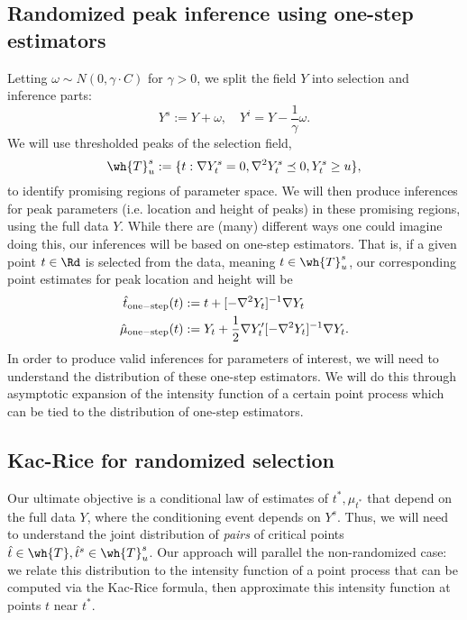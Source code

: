 \documentclass{article}
\begin{document}
	\subsection{Randomized peak inference using one-step estimators}
	Letting $\omega \sim N(0,\gamma \cdot C)$ for $\gamma > 0$, we split the field $Y$ into selection and inference parts:
	\begin{equation*}
		Y^s := Y + \omega, \quad Y^i = Y - \frac{1}{\gamma} \omega.
	\end{equation*}
	We will use thresholded peaks of the selection field,
	\begin{equation*}
		\wh{T}_u^s := \{t: \nabla Y_t^s = 0, \nabla^2 Y_t^s \preceq 0, Y_t^s \geq u\},
	\end{equation*}
	to identify promising regions of parameter space. We will then produce inferences for peak parameters (i.e. location and height of peaks) in these promising regions, using the full data $Y$. While there are (many) different ways one could imagine doing this, our inferences will be based on one-step estimators. That is, if a given point $t \in \Rd$ is selected from the data, meaning $t \in \wh{T}_u^s$, our corresponding point estimates for peak location and height will be
	\begin{align*}
		\hat{t}_{{\rm one-step}}(t) 
		& := 
		t + [-\nabla^2 Y_t]^{-1} \nabla Y_t \\
		\hat{\mu}_{{\rm one-step}}(t) 
		& := 
		Y_t + \frac{1}{2}\nabla Y_t'[-\nabla^2 Y_t]^{-1} \nabla Y_t.
	\end{align*}
	In order to produce valid inferences for parameters of interest, we will need to understand the distribution of these one-step estimators. We will do this through asymptotic expansion of the intensity function of a certain point process which can be tied to the distribution of one-step estimators.
	
	\subsection{Kac-Rice for randomized selection}
	Our ultimate objective is a conditional law of estimates of $t^*, \mu_{t^*}$ that depend on the full data $Y$, where the conditioning event depends on $Y^s$. Thus, we will need to understand the joint distribution of \emph{pairs} of critical points $\hat{t} \in \wh{T}, \hat{t}^s \in \wh{T}_u^{s}$. Our approach will parallel the non-randomized case: we relate this distribution to the intensity function of a point process that can be computed via the Kac-Rice formula, then approximate this intensity function at points $t$ near $t^*$.
	
\end{document}

